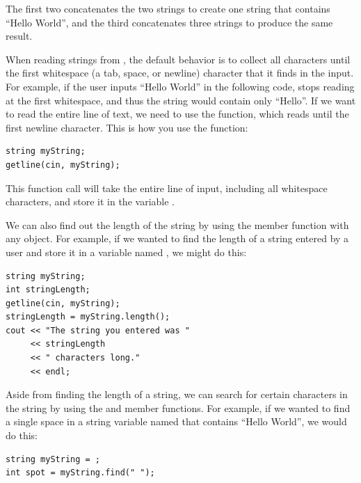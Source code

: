 \noindent The first two concatenates the two strings to create one string that contains ``Hello World'', and the third concatenates three strings to produce the same result.

When reading strings from , the default behavior is to collect all characters until the first whitespace (a tab, space, or newline) character that it finds in the input.
For example, if the user inputs ``Hello World'' in the following code,  stops reading at the first whitespace, and thus the string would contain only ``Hello''.
If we want to read the entire line of text, we need to use the  function, which reads until the first newline character.
This is how you use the  function:

\noindent\begin{minipage}{\linewidth}\begin{lstlisting}
string myString;
getline(cin, myString);
\end{lstlisting}\end{minipage}

\noindent This function call will take the entire line of input, including all whitespace characters, and store it in the variable . 
		
We can also find out the length of the string by using the member function  with any  object.
For example, if we wanted to find the length of a string entered by a user and store it in a variable named , we might do this:

\noindent\begin{minipage}{\linewidth}\begin{lstlisting}
string myString;
int stringLength;
getline(cin, myString);
stringLength = myString.length();
cout << "The string you entered was "
     << stringLength
     << " characters long."
     << endl;
\end{lstlisting}\end{minipage}

\noindent Aside from finding the length of a string, we can search for certain characters in the string by using the  and  member functions.
For example, if we wanted to find a single space in a string variable named  that contains ``Hello World'', we would do this:

\noindent\begin{minipage}{\linewidth}\begin{lstlisting}
string myString = ;
int spot = myString.find(" ");
\end{lstlisting}\end{minipage}

